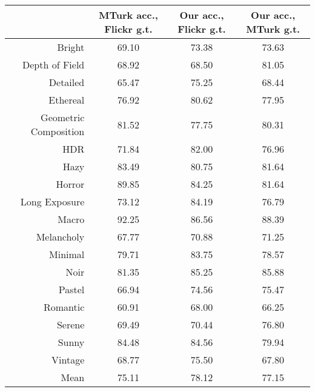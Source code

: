 \begin{tabular}{rccc}
\toprule
{}                    & MTurk acc., Flickr g.t. & Our acc., Flickr g.t. & Our acc., MTurk g.t. \\
\midrule
Bright                & 69.10                       & 73.38                     & 73.63 \\
Depth of Field        & 68.92                       & 68.50                     & 81.05 \\
Detailed              & 65.47                       & 75.25                     & 68.44 \\
Ethereal              & 76.92                       & 80.62                     & 77.95 \\
Geometric Composition & 81.52                       & 77.75                     & 80.31 \\
HDR                   & 71.84                       & 82.00                     & 76.96 \\
Hazy                  & 83.49                       & 80.75                     & 81.64 \\
Horror                & 89.85                       & 84.25                     & 81.64 \\
Long Exposure         & 73.12                       & 84.19                     & 76.79 \\
Macro                 & 92.25                       & 86.56                     & 88.39 \\
Melancholy            & 67.77                       & 70.88                     & 71.25 \\
Minimal               & 79.71                       & 83.75                     & 78.57 \\
Noir                  & 81.35                       & 85.25                     & 85.88 \\
Pastel                & 66.94                       & 74.56                     & 75.47 \\
Romantic              & 60.91                       & 68.00                     & 66.25 \\
Serene                & 69.49                       & 70.44                     & 76.80 \\
Sunny                 & 84.48                       & 84.56                     & 79.94 \\
Vintage               & 68.77                       & 75.50                     & 67.80 \\
\midrule
Mean                  & 75.11                       & 78.12                     & 77.15 \\
\end{tabular}

